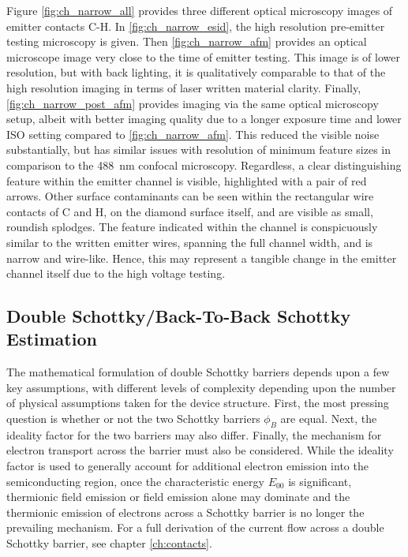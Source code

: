\begin{refsection}
Figure \ref{fig:ch_narrow_all} provides three different optical microscopy images of emitter contacts C-H. In \ref{fig:ch_narrow_esid}, the high resolution pre-emitter testing microscopy is given. Then \ref{fig:ch_narrow_afm} provides an optical microscope image very close to the time of emitter testing. This image is of lower resolution, but with back lighting, it is qualitatively comparable to that of the high resolution imaging in terms of laser written material clarity. Finally, \ref{fig:ch_narrow_post_afm} provides imaging via the same optical microscopy setup, albeit with better imaging quality due to a longer exposure time and lower ISO setting compared to \ref{fig:ch_narrow_afm}. This reduced the visible noise substantially, but has similar issues with resolution of minimum feature sizes in comparison to the 488~\si{\nano\metre} confocal microscopy. Regardless, a clear distinguishing feature within the emitter channel is visible, highlighted with a pair of red arrows. Other surface contaminants can be seen within the rectangular wire contacts of C and H, on the diamond surface itself, and are visible as small, roundish splodges. The feature indicated within the channel is conspicuously similar to the written emitter wires, spanning the full channel width, and is narrow and wire-like. Hence, this may represent a tangible change in the emitter channel itself due to the high voltage testing.


\subsection{Double Schottky/Back-To-Back Schottky Estimation}
The mathematical formulation of double Schottky barriers depends upon a few key assumptions, with different levels of complexity depending upon the number of physical assumptions taken for the device structure. First, the most pressing question is whether or not the two Schottky barriers $\phi_{B}$ are equal. Next, the ideality factor for the two barriers may also differ. Finally, the mechanism for electron transport across the barrier must also be considered. While the ideality factor is used to generally account for additional electron emission into the semiconducting region, once the characteristic energy $E_{00}$ is significant, thermionic field emission or field emission alone may dominate and the thermionic emission of electrons across a Schottky barrier is no longer the prevailing mechanism. For a full derivation of the current flow across a double Schottky barrier, see chapter \ref{ch:contacts}.


\end{refsection}
